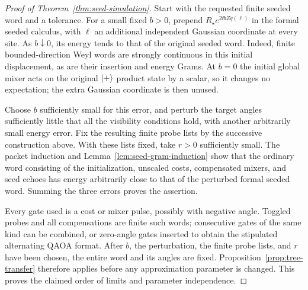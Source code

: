 \begin{proof}[Proof of Theorem~\ref{thm:seed-simulation}]
Start with the requested finite seeded word and a tolerance.  For a
small fixed \(b>0\), prepend
\(R_\star e^{2\ii b Zq(\ell)}\) in the formal seeded calculus, with
\(\ell\) an additional independent Gaussian coordinate at every site.
As \(b\downarrow0\), its energy tends to that of the original seeded
word.  Indeed, finite bounded-direction Weyl words are strongly
continuous in this initial displacement, as are their insertion and
energy Grams.  At \(b=0\) the initial global mixer acts on the original
\(\lvert +\rangle\) product state by a scalar, so it changes no expectation;
the extra Gaussian coordinate is then unused.

Choose \(b\) sufficiently small for this error, and perturb the target
angles sufficiently little that all the visibility conditions hold,
with another arbitrarily small energy error.  Fix the resulting finite
probe lists by the successive construction above.  With these lists
fixed, take \(r>0\) sufficiently small.  The packet induction and
Lemma~\ref{lem:seed-gram-induction} show that the ordinary word consisting
of the initialization, unscaled costs, compensated mixers, and seed
echoes has energy arbitrarily close to that of the perturbed formal
seeded word.  Summing the three errors proves the assertion.

Every gate used is a cost or mixer pulse, possibly with negative angle.
Toggled probes and all compensations are finite such words; consecutive
gates of the same kind can be combined, or zero-angle gates inserted
to obtain the stipulated alternating QAOA format.  After \(b\), the
perturbation, the finite probe lists, and \(r\) have been chosen, the
entire word and its angles are fixed.  Proposition~\ref{prop:tree-transfer}
therefore applies before any approximation parameter is changed.
This proves the claimed order of limits and parameter independence.
\end{proof}

